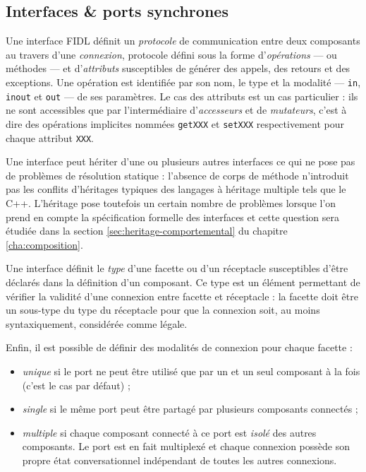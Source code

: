\subsection{Interfaces \& ports synchrones}

Une interface \textsf{FIDL} d\'efinit un \emph{protocole} de communication entre deux
composants au travers d'une \emph{connexion}, protocole d\'efini sous la forme d'\emph{op\'erations}  --- ou
m\'ethodes --- et d'\emph{attributs} susceptibles de g\'en\'erer des
appels, des retours et des exceptions. Une op\'eration est identifi\'ee
par son nom, le type et la modalit\'e ---  \texttt{in},
\texttt{inout} et \texttt{out} --- de ses param\`etres. 
Le cas des attributs est un cas particulier : ils ne sont accessibles que
par l'interm\'ediaire d'\emph{accesseurs} et de \emph{mutateurs}, c'est
\`a dire des op\'erations implicites nomm\'ees \texttt{getXXX} et
\texttt{setXXX} respectivement pour chaque attribut \texttt{XXX}. 

Une interface peut h\'eriter d'une ou plusieurs autres interfaces ce qui
ne pose pas de probl\`emes de r\'esolution statique : l'absence de corps
de m\'ethode n'introduit pas les conflits d'h\'eritages typiques des
langages \`a h\'eritage multiple tels que le \textsf{C++}. L'h\'eritage pose
toutefois un certain nombre de probl\`emes lorsque l'on prend en compte
la sp\'ecification formelle des interfaces et cette question sera
\'etudi\'ee dans la section \ref{sec:heritage-comportemental} du chapitre \ref{cha:composition}.

Une interface d\'efinit le \emph{type} d'une facette ou d'un
r\'eceptacle susceptibles d'\^etre d\'eclar\'es dans la
d\'efinition d'un composant. Ce type est un \'el\'ement permettant de
v\'erifier la validit\'e d'une connexion entre facette et r\'eceptacle : la
facette doit \^etre un sous-type du type du r\'eceptacle pour que la
connexion soit, au moins syntaxiquement, consid\'er\'ee comme l\'egale. 

Enfin, il est possible de d\'efinir des modalit\'es de connexion pour
chaque facette :
\begin{itemize}
\item \emph{unique} si le port ne peut \^etre utilis\'e que par un et un
  seul composant \`a la fois  (c'est le cas par d\'efaut) ;
  \item \emph{single} si le m\^eme port peut \^etre partag\'e par
  plusieurs composants connect\'es ;
\item \emph{multiple} si chaque composant connect\'e \`a ce port est
  \emph{isol\'e} des autres composants. Le port est en fait multiplex\'e
  et chaque connexion poss\`ede son propre \'etat conversationnel
  ind\'ependant de toutes les autres connexions.
\end{itemize}

